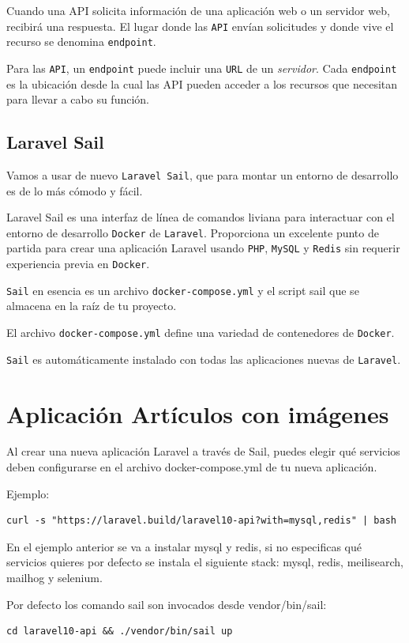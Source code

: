 \documentclass[11pt]{article}
\begin{document}
Cuando una API solicita información de una aplicación web o un
servidor web, recibirá una respuesta. El lugar donde las \texttt{API} envían
solicitudes y donde vive el recurso se denomina \texttt{endpoint}.

Para las \texttt{API}, un \texttt{endpoint} puede incluir una \texttt{URL} de un
\emph{servidor}. Cada \texttt{endpoint} es la ubicación desde la cual las API pueden
acceder a los recursos que necesitan para llevar a cabo su función.

\subsection{Laravel Sail}
\label{sec:orgcf6d464}
Vamos a usar de nuevo \texttt{Laravel Sail}, que para montar un entorno de
desarrollo es de lo más cómodo y fácil.

Laravel Sail es una interfaz de línea de comandos liviana para
interactuar con el entorno de desarrollo \texttt{Docker} de
\texttt{Laravel}. Proporciona un excelente punto de partida para crear una
aplicación Laravel usando \texttt{PHP}, \texttt{MySQL} y \texttt{Redis} sin requerir
experiencia previa en \texttt{Docker}.

\texttt{Sail} en esencia es un archivo \texttt{docker-compose.yml} y el script sail
que se almacena en la raíz de tu proyecto.

El archivo \texttt{docker-compose.yml} define una variedad de contenedores de
\texttt{Docker}.

\texttt{Sail} es automáticamente instalado con todas las aplicaciones nuevas de
\texttt{Laravel}.


\section{Aplicación Artículos con imágenes}
\label{sec:orgbf5e11f}
Al crear una nueva aplicación Laravel a través de Sail, puedes elegir
qué servicios deben configurarse en el archivo docker-compose.yml de
tu nueva aplicación.

Ejemplo:
\begin{verbatim}
curl -s "https://laravel.build/laravel10-api?with=mysql,redis" | bash
\end{verbatim}

En el ejemplo anterior se va a instalar mysql y redis, si no
especificas qué servicios quieres por defecto se instala el siguiente
stack: mysql, redis, meilisearch, mailhog y selenium.

Por defecto los comando sail son invocados desde vendor/bin/sail:
\begin{verbatim}
cd laravel10-api && ./vendor/bin/sail up
\end{verbatim}
\end{document}
